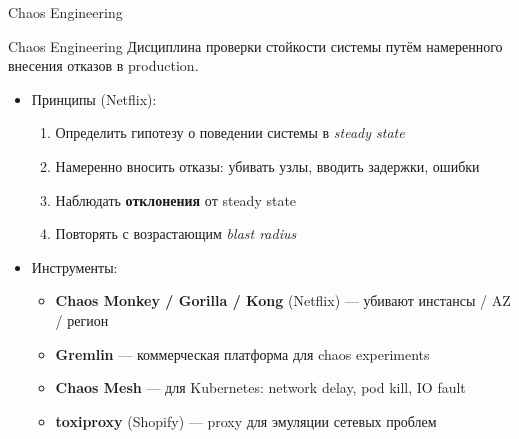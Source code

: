 \documentclass{beamer}
\begin{document}
\begin{frame}{Chaos Engineering}
\begin{block}{Chaos Engineering}
  Дисциплина проверки стойкости системы путём намеренного внесения отказов в production.
\end{block}
\begin{itemize}
  \item Принципы (Netflix):
  \begin{enumerate}
    \item Определить гипотезу о поведении системы в \emph{steady state}
    \item Намеренно вносить отказы: убивать узлы, вводить задержки, ошибки
    \item Наблюдать \textbf{отклонения} от steady state
    \item Повторять с возрастающим \emph{blast radius}
  \end{enumerate}
  \item Инструменты:
  \begin{itemize}
    \item \textbf{Chaos Monkey / Gorilla / Kong} (Netflix) --- убивают инстансы / AZ / регион
    \item \textbf{Gremlin} --- коммерческая платформа для chaos experiments
    \item \textbf{Chaos Mesh} --- для Kubernetes: network delay, pod kill, IO fault
    \item \textbf{toxiproxy} (Shopify) --- proxy для эмуляции сетевых проблем
  \end{itemize}
\end{itemize}
\end{frame}
\end{document}
